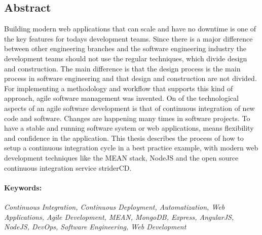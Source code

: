 \subsection*{Abstract}
Building modern web applications that can scale and have no downtime is one of the key features for todays development teams. Since there
is a major difference between other engineering branches and the software engineering industry the development teams should not use
the regular techniques, which divide design and construction. The main difference is that the design process is the main process in
software engineering and that design and construction are not divided. For implementing a methodology and workflow that supports
this kind of approach, agile software management was invented. On of the technological aspects of an agile software development is that
of continuous integration of new code and software. Changes are happening many times in software projects. To have a stable and running
software system or web applications, means flexibility and confidence in the application. This thesis describes the process of how to setup
a continuous integration cycle in a best practice example, with modern web development techniques like the MEAN stack, NodeJS and the open
source continuous integration service striderCD.


\paragraph{Keywords:}
\textit{Continuous Integration, Continuous Deployment, Automatization, Web Applications, Agile Development, MEAN, MongoDB, Express, AngularJS, NodeJS, DevOps, Software Engineering, Web Development}

